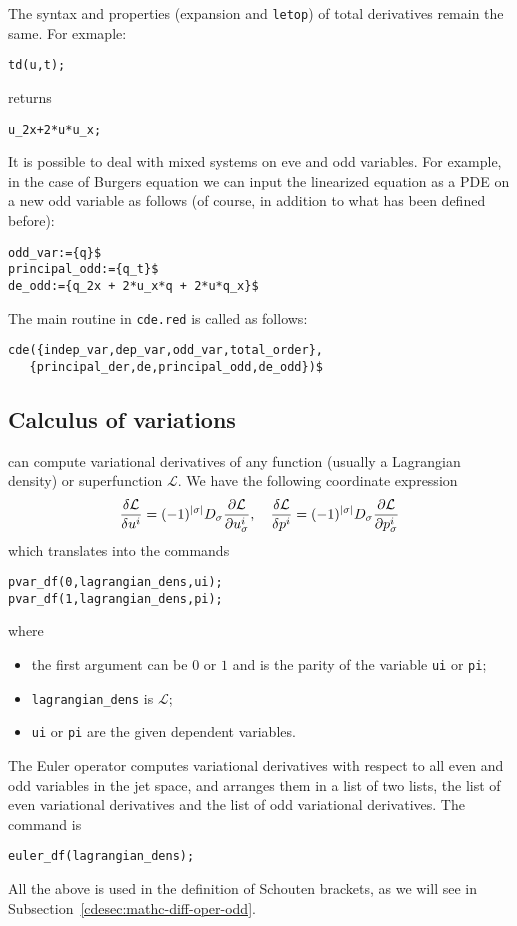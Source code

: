 The syntax and properties (expansion and \texttt{letop}) of total derivatives
remain the same. For exmaple:
\begin{verbatim}
td(u,t);
\end{verbatim}
returns
\begin{verbatim}
u_2x+2*u*u_x;
\end{verbatim}

It is possible to deal with mixed systems on eve and odd variables. For
example, in the case of Burgers equation we can input the linearized equation
as a PDE on a new odd variable as follows (of course, in addition to what has
been defined before):
\begin{verbatim}
odd_var:={q}$
principal_odd:={q_t}$
de_odd:={q_2x + 2*u_x*q + 2*u*q_x}$
\end{verbatim}
The main routine in \texttt{cde.red} is called as follows:
\begin{verbatim}
cde({indep_var,dep_var,odd_var,total_order},
   {principal_der,de,principal_odd,de_odd})$
\end{verbatim}

\subsection{Calculus of variations}
\label{cdesec:calculus-variations}

\cde can compute variational derivatives of any function (usually a Lagrangian
density) or superfunction $\mathcal{L}$. We have the following coordinate
expression
\begin{equation}
  \label{eq:9}
  \fd{\mathcal{L}}{u^i} = (-1)^{|\sigma|}D_\sigma\pd{\mathcal{L}}{u^i_\sigma},
  \quad
    \fd{\mathcal{L}}{p^i} = (-1)^{|\sigma|}D_\sigma\pd{\mathcal{L}}{p^i_\sigma}
\end{equation}
which translates into the \cde commands
\begin{verbatim}
pvar_df(0,lagrangian_dens,ui);
pvar_df(1,lagrangian_dens,pi);
\end{verbatim}
where
\begin{itemize}
\item the first argument can be $0$ or $1$ and is the parity of the variable
  \texttt{ui} or \texttt{pi};
\item \texttt{lagrangian\_dens} is $\mathcal{L}$;
\item \texttt{ui} or \texttt{pi} are the given dependent variables.
\end{itemize}
The Euler operator computes variational derivatives with respect to all even
and odd variables in the jet space, and arranges them in a list of two lists,
the list of even variational derivatives and the list of odd variational
derivatives. The command is
\begin{verbatim}
euler_df(lagrangian_dens);
\end{verbatim}
All the above is used in the definition of Schouten brackets, as we will see in
Subsection~\ref{cdesec:mathc-diff-oper-odd}.


